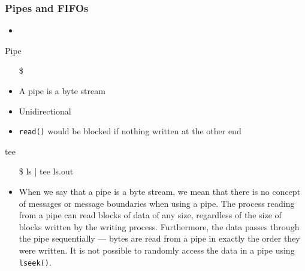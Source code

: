 \subsubsection{Pipes and FIFOs}
\label{sec:pipes-fifos}

\begin{itemize}
\item {}
\end{itemize}

\begin{frame}{Pipe}
  \begin{itemize}
  \item[\$] 
  \end{itemize}
  \begin{center}
  \end{center}
  \begin{itemize}
  \item A pipe is a byte stream
  \item Unidirectional
  \item \texttt{read()} would be blocked if nothing written at the other end
  \end{itemize}
  \ttfamily
  \begin{block}{tee}
    \begin{center}
      \begin{minipage}{.35\linewidth}
        \begin{itemize}
        \item[\$] ls | tee ls.out
        \end{itemize}
      \end{minipage}\quad
      \begin{minipage}{.55\linewidth}
      \end{minipage}
    \end{center}
  \end{block}
\end{frame}

\begin{itemize}
\item When we say that a pipe is a byte stream, we mean that there is no concept of
  messages or message boundaries when using a pipe. The process reading from a pipe can
  read blocks of data of any size, regardless of the size of blocks written by the writing
  process. Furthermore, the data passes through the pipe sequentially --- bytes are read from
  a pipe in exactly the order they were written. It is not possible to randomly access the
  data in a pipe using \texttt{lseek()}. 
\end{itemize}


